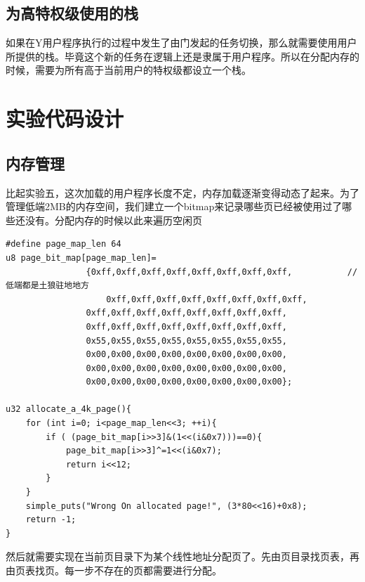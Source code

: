 \documentclass[a4paper,11pt,UTF8]{ctexart}
\begin{document}
	\subsection{为高特权级使用的栈}
	如果在Y用户程序执行的过程中发生了由门发起的任务切换，那么就需要使用用户所提供的栈。毕竟这个新的任务在逻辑上还是隶属于用户程序。所以在分配内存的时候，需要为所有高于当前用户的特权级都设立一个栈。\\

\section{实验代码设计}
	\subsection{内存管理}
	比起实验五，这次加载的用户程序长度不定，内存加载逐渐变得动态了起来。为了管理低端2MB的内存空间，我们建立一个bitmap来记录哪些页已经被使用过了哪些还没有。分配内存的时候以此来遍历空闲页
	\begin{lstlisting}[language={[ANSI]C},keywordstyle=\color{blue!70},commentstyle=\color{red!50!green!50!blue!50},frame=shadowbox, rulesepcolor=\color{red!20!green!20!blue!20}]
#define page_map_len 64
u8 page_bit_map[page_map_len]=
				{0xff,0xff,0xff,0xff,0xff,0xff,0xff,0xff,			//低端都是土狼驻地地方
					0xff,0xff,0xff,0xff,0xff,0xff,0xff,0xff,
				0xff,0xff,0xff,0xff,0xff,0xff,0xff,0xff,
				0xff,0xff,0xff,0xff,0xff,0xff,0xff,0xff,
				0x55,0x55,0x55,0x55,0x55,0x55,0x55,0x55,
				0x00,0x00,0x00,0x00,0x00,0x00,0x00,0x00,
				0x00,0x00,0x00,0x00,0x00,0x00,0x00,0x00,
				0x00,0x00,0x00,0x00,0x00,0x00,0x00,0x00};

u32 allocate_a_4k_page(){
	for (int i=0; i<page_map_len<<3; ++i){
		if ( (page_bit_map[i>>3]&(1<<(i&0x7)))==0){
			page_bit_map[i>>3]^=1<<(i&0x7);
			return i<<12;
		}
	}
	simple_puts("Wrong On allocated page!", (3*80<<16)+0x8);
	return -1;
}
	\end{lstlisting}
	然后就需要实现在当前页目录下为某个线性地址分配页了。先由页目录找页表，再由页表找页。每一步不存在的页都需要进行分配。
\end{document}
